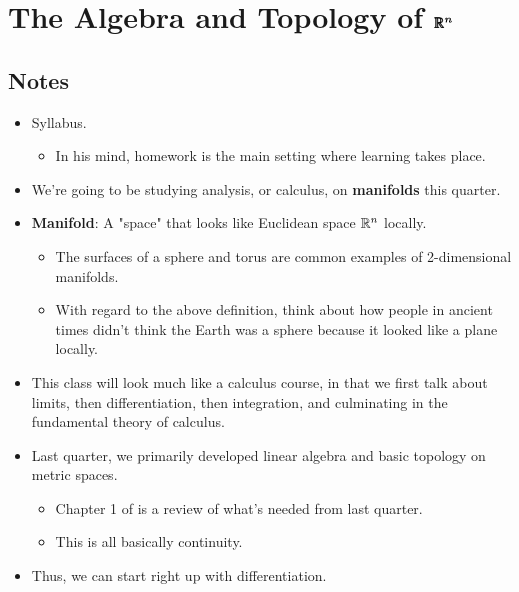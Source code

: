 \documentclass[../notes.tex]{subfiles}
\begin{document}
\chapter{The Algebra and Topology of \texorpdfstring{$\pmb{\mathbb{R}}^{\bm{n}}$}{TEXT}}
\section{Notes}
\begin{itemize}
    \item {}Syllabus.
    \begin{itemize}
        \item In his mind, homework is the main setting where learning takes place.
    \end{itemize}
    \item We're going to be studying analysis, or calculus, on \textbf{manifolds} this quarter.
    \item \textbf{Manifold}: A "space" that looks like Euclidean space $\mathbb{R}^n$ locally.
    \begin{itemize}
        \item The surfaces of a sphere and torus are common examples of 2-dimensional manifolds.
        \item With regard to the above definition, think about how people in ancient times didn't think the Earth was a sphere because it looked like a plane locally.
    \end{itemize}
    \item This class will look much like a calculus course, in that we first talk about limits, then differentiation, then integration, and culminating in the fundamental theory of calculus.
    \item Last quarter, we primarily developed linear algebra and basic topology on metric spaces.
    \begin{itemize}
        \item Chapter 1 of \textcite{bib:Munkres} is a review of what's needed from last quarter.
        \item This is all basically continuity.
    \end{itemize}
    \item Thus, we can start right up with differentiation.
\end{itemize}
\end{document}
